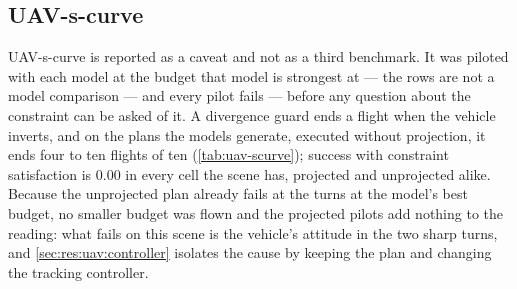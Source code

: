 \subsection{UAV-s-curve}\label{sec:res:uav:scurve}

UAV-s-curve is reported as a caveat and not as a third benchmark. It was piloted with each model at the
budget that model is strongest at --- the rows are not a model comparison --- and every pilot fails --- before any question about the constraint can
be asked of it. A divergence guard ends a flight when the vehicle inverts, and on the plans the models
generate, executed without projection, it ends four to ten flights of ten (\autoref{tab:uav-scurve});
success with constraint satisfaction is $0.00$ in every cell the scene has, projected and unprojected
alike. Because the unprojected plan already fails at the turns at the model's best budget, no smaller
budget was flown and the projected pilots add nothing to the reading: what fails on this scene is the
vehicle's attitude in the two sharp turns, and \autoref{sec:res:uav:controller} isolates the cause by
keeping the plan and changing the tracking controller.

